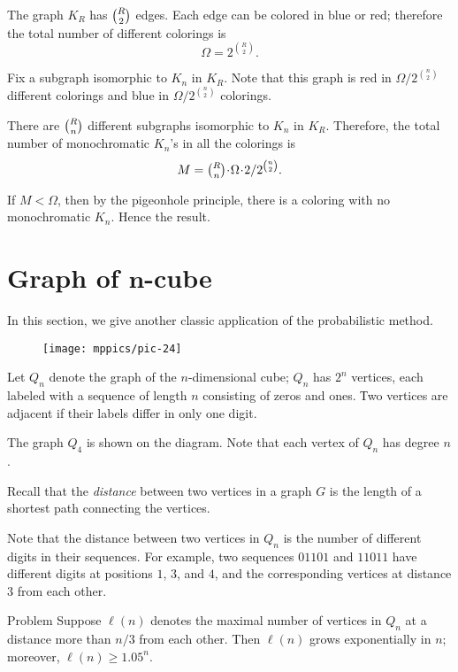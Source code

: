 The graph $K_R$ has $\tbinom{R}{2}$ edges.
Each edge can be colored in blue or red;
therefore the total number of different colorings is \[\Omega=2^{\binom{R}{2}}.\]

Fix a subgraph isomorphic to $K_n$ in $K_R$.
Note that this graph is red in $\Omega/2^{\binom n2}$ different colorings
and blue in $\Omega/2^{\binom n2}$ colorings.

There are $\tbinom Rn$ different subgraphs isomorphic to $K_n$ in $K_R$.
Therefore, the total number of monochromatic $K_n$'s in all the colorings 
is 
\[M=\tbinom Rn\cdot\Omega\cdot  2/2^{\binom n2}.\]

If $M<\Omega$, then by the pigeonhole principle,
there is a coloring with no monochromatic $K_n$.
Hence the result.
\qeds

\section[\texorpdfstring{Graph of $n$-cube}{Graph of n-cube}]{Graph of $\bm{n}$-cube}

In this section, we give another classic application of the probabilistic method.

\begin{wrapfigure}{o}{25mm}
\vskip-0mm
\centering
\texttt{[image: mppics/pic-24]}
\vskip-0mm
\end{wrapfigure}

Let $Q_n$ denote the graph of the $n$-dimensional cube;
$Q_n$ has $2^n$ vertices, each labeled with a sequence of length $n$ consisting  of zeros and ones.
Тwo vertices are adjacent if their labels differ in only one digit.

The graph $Q_4$ is shown on the diagram.
Note that each vertex of $Q_n$ has degree $n$.

Recall that the \emph{distance} between two vertices in a graph $G$ is the length of a shortest path connecting the vertices.

Note that the distance between two vertices in $Q_n$ is the number of different digits in their sequences.
For example, two sequences $01101$ and $11011$ have different digits at positions $1$, $3$, and $4$,
and the corresponding vertices at distance $3$ from each other.


\begin{thm}{Problem}\label{prob:Qn}
Suppose $\ell(n)$ denotes the maximal number of vertices in $Q_n$ at a distance more than $n/3$ from each other.
Then $\ell(n)$ grows exponentially in $n$;
moreover, $\ell(n)\ge 1.05^n$. 
\end{thm}

